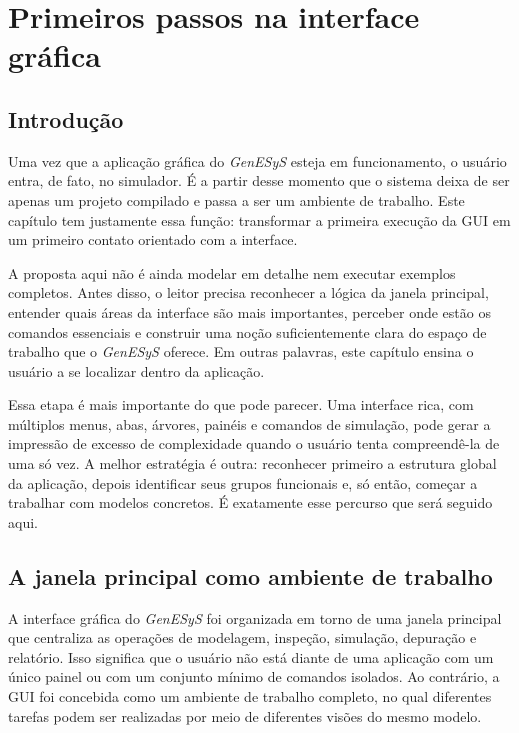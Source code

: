 \chapter{Primeiros passos na interface gráfica}
\label{chap:primeiros_passos_interface_grafica}

\section{Introdução}
\label{sec:cap3_introducao}

Uma vez que a aplicação gráfica do \textit{GenESyS} esteja em funcionamento, o usuário entra, de fato, no simulador. É a partir desse momento que o sistema deixa de ser apenas um projeto compilado e passa a ser um ambiente de trabalho. Este capítulo tem justamente essa função: transformar a primeira execução da GUI em um primeiro contato orientado com a interface.

A proposta aqui não é ainda modelar em detalhe nem executar exemplos completos. Antes disso, o leitor precisa reconhecer a lógica da janela principal, entender quais áreas da interface são mais importantes, perceber onde estão os comandos essenciais e construir uma noção suficientemente clara do espaço de trabalho que o \textit{GenESyS} oferece. Em outras palavras, este capítulo ensina o usuário a se localizar dentro da aplicação.

Essa etapa é mais importante do que pode parecer. Uma interface rica, com múltiplos menus, abas, árvores, painéis e comandos de simulação, pode gerar a impressão de excesso de complexidade quando o usuário tenta compreendê-la de uma só vez. A melhor estratégia é outra: reconhecer primeiro a estrutura global da aplicação, depois identificar seus grupos funcionais e, só então, começar a trabalhar com modelos concretos. É exatamente esse percurso que será seguido aqui.

\section{A janela principal como ambiente de trabalho}
\label{sec:cap3_janela_principal_ambiente}

A interface gráfica do \textit{GenESyS} foi organizada em torno de uma janela principal que centraliza as operações de modelagem, inspeção, simulação, depuração e relatório. Isso significa que o usuário não está diante de uma aplicação com um único painel ou com um conjunto mínimo de comandos isolados. Ao contrário, a GUI foi concebida como um ambiente de trabalho completo, no qual diferentes tarefas podem ser realizadas por meio de diferentes visões do mesmo modelo.

